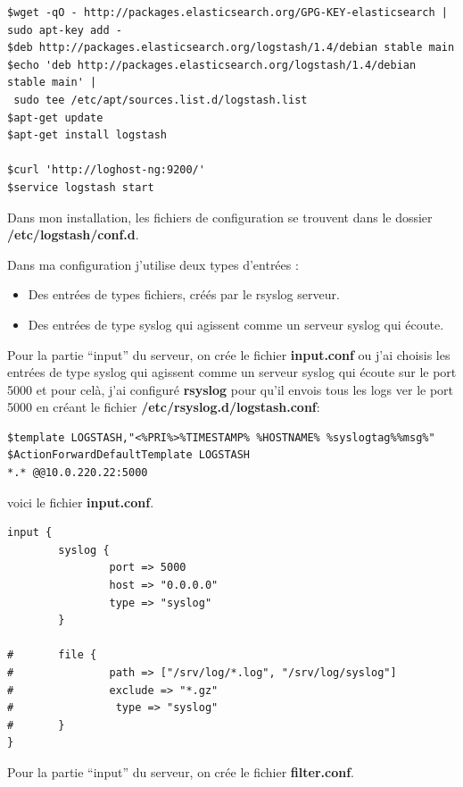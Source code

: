 \documentclass[11pt,a4paper]{article}
\begin{document}
\begin{verbatim}
$wget -qO - http://packages.elasticsearch.org/GPG-KEY-elasticsearch | sudo apt-key add -
$deb http://packages.elasticsearch.org/logstash/1.4/debian stable main
$echo 'deb http://packages.elasticsearch.org/logstash/1.4/debian stable main' | 
 sudo tee /etc/apt/sources.list.d/logstash.list
$apt-get update
$apt-get install logstash
 
$curl 'http://loghost-ng:9200/'
$service logstash start 
\end{verbatim}
Dans mon installation, les fichiers de configuration se trouvent dans le dossier \textbf{/etc/logstash/conf.d}.

Dans ma configuration j’utilise deux types d’entrées :
\begin{itemize}
    \item Des entrées de types fichiers, créés par le rsyslog serveur.
    \item Des entrées de type syslog qui agissent comme un serveur syslog qui écoute.
\end{itemize}

Pour la partie “input” du serveur, on crée le fichier \textbf{input.conf} ou j'ai choisis les entrées de type syslog qui agissent comme un serveur syslog qui écoute sur le port 5000 et pour celà, j'ai configuré \textbf{rsyslog} pour qu'il envois tous les logs ver le port 5000 en créant le fichier \textbf{/etc/rsyslog.d/logstash.conf}:
\begin{verbatim}
$template LOGSTASH,"<%PRI%>%TIMESTAMP% %HOSTNAME% %syslogtag%%msg%"
$ActionForwardDefaultTemplate LOGSTASH
*.* @@10.0.220.22:5000
\end{verbatim}
voici le fichier \textbf{input.conf}.
\begin{verbatim}
input {
        syslog {
                port => 5000
                host => "0.0.0.0"
                type => "syslog"
        }

#       file {
#               path => ["/srv/log/*.log", "/srv/log/syslog"]
#               exclude => "*.gz"
#                type => "syslog"
#       }
}
\end{verbatim}

Pour la partie “input” du serveur, on crée le fichier \textbf{filter.conf}.
\end{document}
